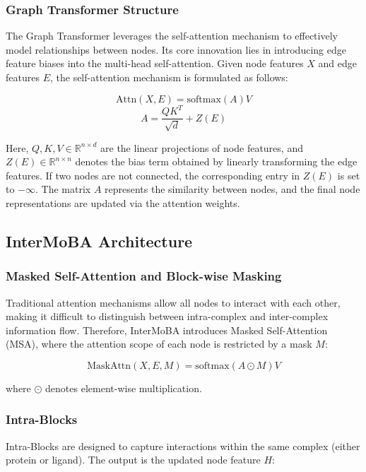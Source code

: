 \documentclass[lettersize,journal]{IEEEtran}
\begin{document}
\subsubsection{Graph Transformer Structure}
The Graph Transformer\cite{yun2019graph}\cite{yuan2022alphafold2} leverages the self-attention mechanism to
effectively model relationships between nodes. Its core innovation lies
in introducing edge feature biases into the multi-head self-attention.
Given node features $X$ and edge features $E$, the
self-attention mechanism is formulated as follows:

\begin{equation}
\text{Attn}(X,E) = \text{softmax}(A)V
\end{equation}
\begin{equation}
A = \frac{QK^{T}}{\sqrt{d}} + Z(E)
\end{equation}

Here, $Q,K,V \in \mathbb{R}^{n \times d}$ are the linear projections of
node features, and $Z(E) \in \mathbb{R}^{n \times n}$ denotes the bias
term obtained by linearly transforming the edge features. If two nodes
are not connected, the corresponding entry in $Z(E)$ is set
to $-\infty$. The matrix $A$ represents the similarity between nodes,
and the final node representations are updated via the attention
weights.

\subsection{InterMoBA Architecture}
\subsubsection{Masked Self-Attention\cite{lee2018pre} and Block-wise Masking}
Traditional attention mechanisms allow all nodes to interact with each
other, making it difficult to distinguish between
intra-complex and inter-complex information flow. Therefore, InterMoBA
introduces Masked Self-Attention (MSA), where the attention scope of
each node is restricted by a mask $M$:

\begin{equation}
\text{MaskAttn}(X,E,M) = \text{softmax}(A \odot M)V
\end{equation}

where $\odot$ denotes element-wise multiplication.

\subsubsection{Intra-Blocks}
Intra-Blocks are designed to capture interactions within
the same complex (either protein or ligand). The output is the updated
node feature $H$:
\end{document}
